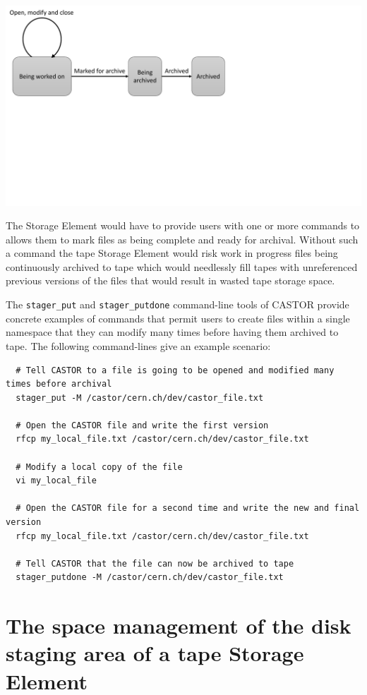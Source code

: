 \documentclass{article}
\begin{document}
  \includegraphics[width=\linewidth,scale=0.8,trim=0mm 100mm 0mm 0mm 0mm]{CTA_3_phase_file}
  
  The Storage Element would have to provide users with one or more commands to allows them to mark files as being complete and ready for archival.  Without such a command the tape Storage Element would risk work in progress files being continuously archived to tape which would needlessly fill tapes with unreferenced previous versions of the files that would result in wasted tape storage space.

  The \texttt{stager\_put} and \texttt{stager\_putdone} command-line tools of CASTOR provide concrete examples of commands that permit users to create files within a single namespace that they can modify many times before having them archived to tape.  The following command-lines give an example scenario:
  \begin{verbatim}
  # Tell CASTOR to a file is going to be opened and modified many times before archival
  stager_put -M /castor/cern.ch/dev/castor_file.txt
  
  # Open the CASTOR file and write the first version
  rfcp my_local_file.txt /castor/cern.ch/dev/castor_file.txt
  
  # Modify a local copy of the file
  vi my_local_file
  
  # Open the CASTOR file for a second time and write the new and final version
  rfcp my_local_file.txt /castor/cern.ch/dev/castor_file.txt
  
  # Tell CASTOR that the file can now be archived to tape
  stager_putdone -M /castor/cern.ch/dev/castor_file.txt
  \end{verbatim}

\newpage
\section{The space management of the disk staging area of a tape Storage Element}
\end{document}

